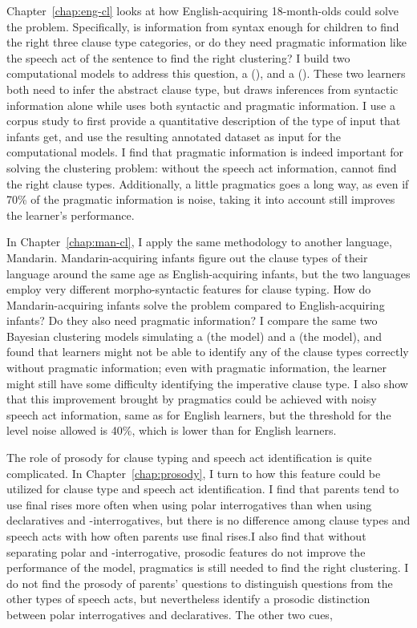 Chapter~\ref{chap:eng-cl} looks at how English-acquiring 18-month-olds could solve the problem. Specifically, is information from syntax enough for children to find the right three clause type categories, or do they need pragmatic information like the speech act of the sentence to find the right clustering? I build two computational models to address this question, a \distlearner{} (\dlearnerabbr{}), and a \praglearner{} (\plearnerabbr{}). These two learners both need to infer the abstract clause type, but \dlearnerabbr{} draws inferences from syntactic information alone while \plearnerabbr{} uses both syntactic and pragmatic information. I use a corpus study to first provide a quantitative description of the type of input that infants get, and use the resulting annotated dataset as input for the computational models. I find that pragmatic information is indeed important for solving the clustering problem: without the speech act information, \dlearnerabbr{} cannot find the right clause types. Additionally, a little pragmatics goes a long way, as even if 70\% of the pragmatic information is noise, taking it into account still improves the learner's performance. 

In Chapter~\ref{chap:man-cl}, I apply the same methodology to another language, Mandarin. Mandarin-acquiring infants figure out the clause types of their language around the same age as English-acquiring infants, but the two languages employ very different morpho-syntactic features for clause typing. How do Mandarin-acquiring infants solve the problem compared to English-acquiring infants? Do they also need pragmatic information? I compare the same two Bayesian clustering models simulating a \distlearner{} (the \dlearnerabbr{} model) and a \praglearner{} (the \plearnerabbr{} model), and found that learners might not be able to identify any of the clause types correctly without pragmatic information; even with pragmatic information, the learner might still have some difficulty identifying the imperative clause type. I also show that this improvement brought by pragmatics could be achieved with noisy speech act information, same as for English learners, but the threshold for the level noise allowed is 40\%, which is lower than for English learners.

The role of prosody for clause typing and speech act identification is quite complicated. In Chapter~\ref{chap:prosody}, I turn to how this feature could be utilized for clause type and speech act identification. I find that parents tend to use final rises more often when using polar interrogatives than when using declaratives and \twh-interrogatives, but there is no difference among clause types and speech acts with how often parents use final rises.I also find that without separating polar and \twh-interrogative, prosodic features do not improve the performance of the \dlearnerabbr{} model, pragmatics is still needed to find the right clustering.  I do not find the prosody of parents' questions to distinguish questions from the other types of speech acts, but nevertheless identify a prosodic distinction between polar interrogatives and declaratives. The other two cues, 

